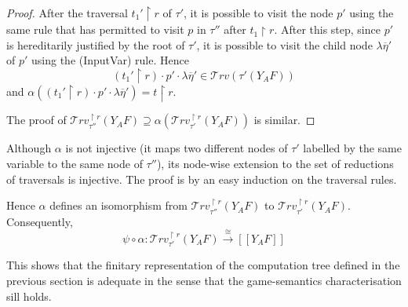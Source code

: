 \documentclass{article}
\newcommand{\sem}[1]{{[\![ #1 ]\!]}}
\newcommand{\travset}{\mathcal{T}rv}
\begin{document}
\begin{proof}
After the traversal $t_1'\upharpoonright r$ of $\tau'$, it is possible to  visit the node $p'$ using the same rule that has permitted to visit $p$ in $\tau''$ after $t_1\upharpoonright r$. After this step, since $p'$ is hereditarily justified by the root of $\tau'$, it is possible to visit the child node $\lambda \overline{\eta}'$ of $p'$ using the (InputVar) rule. Hence 
$$(t_1'\upharpoonright r) \cdot p' \cdot \lambda \overline{\eta}' \in \travset(\tau'(Y_A F)) $$
and $\alpha((t_1'\upharpoonright r) \cdot p' \cdot \lambda \overline{\eta}') = t\upharpoonright r$.

The proof of $\travset^{\upharpoonright r}_{\tau''}(Y_A F) \supseteq \alpha(\travset^{\upharpoonright r}_{\tau'}(Y_A F))$ is similar.
 \end{proof}

Although $\alpha$ is not injective (it maps two different nodes of $\tau'$ labelled by the same variable to the same node of $\tau''$), its node-wise extension to the set of reductions of traversals is injective.
The proof is by an easy induction on the traversal rules.



Hence $\alpha$ defines an isomorphism from $\travset^{\upharpoonright r}_{\tau''}(Y_A F)$ 
to $\travset^{\upharpoonright r}_{\tau'}(Y_A F)$.
Consequently,
$$ \psi  \circ \alpha : \travset^{\upharpoonright r}_{\tau'}( Y_A F) \stackrel{\cong}{\longrightarrow} \sem{Y_A F}$$

This shows that the finitary representation of the computation tree defined in the previous section is adequate in the sense that the game-semantics characterisation sill holds.
\end{document}
